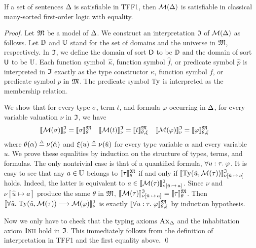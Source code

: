 \begin{theorem}%
\label{thm:mon_sound}%
\afterDot
If a set of sentences $\mathrm{\Delta}$ is satisfiable in TFF1,
then $\mathcal{M}(\mathrm{\Delta})$ is satisfiable in classical
many-sorted first-order logic with equality.
\end{theorem}
\begin{proof}
Let $\mathfrak{M}$ be a model of $\mathrm{\Delta}$.
We construct an interpretation $\mathfrak{I}$ of $\mathcal{M}(\mathrm{\Delta})$ as follows.
Let $\mathbb{D}$ and $\mathbb{U}$ stand for
the set of domains and the universe in $\mathfrak{M}$, respectively.
In $\mathfrak{I}$, we define the domain of sort $\mathsf{D}$ to be $\mathbb{D}$
and the domain of sort $\mathsf{U}$ to be $\mathbb{U}$.
Each function symbol~$\hat{\kappa}$, function symbol $\hat{f}$,
or predicate symbol $\hat{p}$ is interpreted in $\mathfrak{I}$
exactly as the type constructor $\kappa$, function symbol $f$,
or predicate symbol $p$ in $\mathfrak{M}$.
The predicate symbol $\mathrm{Ty}$ is interpreted as the membership relation.

We show that for every type $\sigma$, term $t$,
and formula $\varphi$ occurring in $\mathrm{\Delta}$,
for every variable valuation $\nu$ in $\mathfrak{I}$, we have
\begin{align*}
\llbracket \mathcal{M}(\sigma) \rrbracket^{\mathfrak{I}}_{\nu} &= \llbracket \sigma \rrbracket^{\mathfrak{M}}_{\theta} &
\llbracket \mathcal{M}(t) \rrbracket^{\mathfrak{I}}_{\nu} &= \llbracket t \rrbracket^{\mathfrak{M}}_{\theta,\xi} &
\llbracket \mathcal{M}(\varphi) \rrbracket^{\mathfrak{I}}_{\nu} &= \llbracket \varphi \rrbracket^{\mathfrak{M}}_{\theta,\xi}
\end{align*}
where $\theta(\alpha) \mathrel{\triangleq} \nu(\hat{\alpha})$ and
$\xi(u) \mathrel{\triangleq} \nu(\hat{u})$ for every
type variable $\alpha$ and every variable $u$.
%
We prove these equalities by induction on the structure
of types, terms, and formulas. The only nontrivial case is
that of a quantified formula, $\forall u \mathrel{:} \tau .\; \varphi$.
It is easy to see that any $a \in \mathbb{U}$ belongs
to $\llbracket \tau \rrbracket^{\mathfrak{M}}_\theta$ if and only if
$\llbracket \mathrm{Ty}(\hat{u},\mathcal{M}(\tau)) \rrbracket^{\mathfrak{I}}_{\nu\smash{[\hat{u}\,\mapsto\,a]}}{}_{\vphantom{]}}$
holds. Indeed, the latter is equivalent to
$a \in \llbracket \mathcal{M}(\tau) \rrbracket^{\mathfrak{I}}_{\nu\smash{[\hat{u}\,\mapsto\,a]}}{}_{\vphantom{]}}$.
Since $\nu$ and $\nu[\hat{u} \mapsto a]$ produce the same
$\theta$ in $\mathfrak{M}$,
$\llbracket \mathcal{M}(\tau) \rrbracket^{\mathfrak{I}}_{\nu\smash{[\hat{u}\,\mapsto\,a]}}{}_{\vphantom{]}} =
\llbracket \tau \rrbracket^{\mathfrak{M}}_\theta$.
Then
$\llbracket \forall \hat{u} .\; \mathrm{Ty}(\hat{u},\mathcal{M}(\tau))
\longrightarrow \mathcal{M}(\varphi) \rrbracket^{\mathfrak{I}}_{\nu}$ is exactly
$\llbracket \forall u \mathrel{:} \tau .\; \varphi \rrbracket^{\mathfrak{M}}_{\theta,\xi}$
by induction hypothesis.

Now we only have to check that the typing axioms
$\text{\sc Ax}_{\mathrm{\Delta}}$ and the inhabitation axiom $\text{\sc Inh}$ hold in $\mathfrak{I}$.
This immediately follows from the definition of
interpretation in TFF1 and the first equality above.
\qed
\end{proof}

